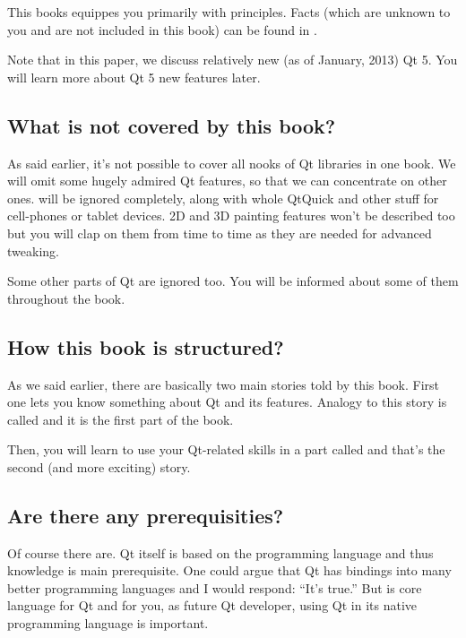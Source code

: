 This books equippes you primarily with principles. Facts (which are unknown to you and are not included in this book) can be found in \citep{various:qtdoc}.

Note that in this paper, we discuss relatively new (as of January, 2013) Qt 5. You will learn more about Qt 5 new features later.


\subsection*{What is not covered by this book?}
As said earlier, it's not possible to cover all nooks of Qt libraries in one book. We will omit some hugely admired Qt features, so that we can concentrate on other ones.  will be ignored completely, along with whole QtQuick and other stuff for cell-phones or tablet devices. 2D and 3D painting features won't be described too but you will clap on them from time to time as they are needed for advanced  tweaking.

Some other parts of Qt are ignored too. You will be informed about some of them throughout the book.

\subsection*{How this book is structured?}
As we said earlier, there are basically two main stories told by this book. First one lets you know something about Qt and its features. Analogy to this story is called  and it is the first part of the book.

Then, you will learn to use your Qt-related skills in a part called  and that's the second (and more exciting) story.

\subsection*{Are there any prerequisities?}
Of course there are. Qt itself is based on the \cpp programming language and thus \cpp knowledge is main prerequisite. One could argue that Qt has bindings into many better programming languages and I would respond: \enquote{It's true.} But \cpp is core language for Qt and for you, as future Qt developer, using Qt in its native programming language is important.

